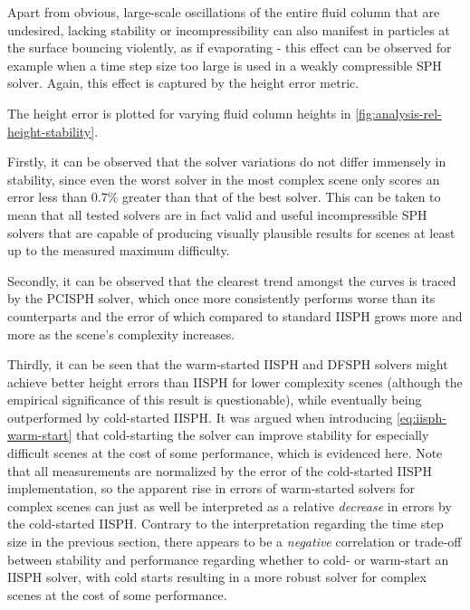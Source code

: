 \documentclass[oneside, a4paper]{book}
\begin{document}
  Apart from obvious, large-scale oscillations of the entire fluid column that are undesired, lacking stability or incompressibility can also manifest in particles at the surface bouncing violently, as if evaporating - this effect can be observed for example when a time step size too large is used in a weakly compressible SPH solver. Again, this effect is captured by the height error metric.

  The height error is plotted for varying fluid column heights in \autoref{fig:analysis-rel-height-stability}. 

  Firstly, it can be observed that the solver variations do not differ immensely in stability, since even the worst solver in the most complex scene only scores an error less than $0.7\%$ greater than that of the best solver. This can be taken to mean that all tested solvers are in fact valid and useful incompressible SPH solvers that are capable of producing visually plausible results for scenes at least up to the measured maximum difficulty. 
  
  Secondly, it can be observed that the clearest trend amongst the curves is traced by the PCISPH solver, which once more consistently performs worse than its counterparts and the error of which compared to standard IISPH grows more and more as the scene's complexity increases. 

  Thirdly, it can be seen that the warm-started IISPH and DFSPH solvers might achieve better height errors than IISPH for lower complexity scenes (although the empirical significance of this result is questionable), while eventually being outperformed by cold-started IISPH. It was argued when introducing \autoref{eq:iisph-warm-start} that cold-starting the solver can improve stability for especially difficult scenes at the cost of some performance, which is evidenced here. Note that all measurements are normalized by the error of the cold-started IISPH implementation, so the apparent rise in errors of warm-started solvers for complex scenes can just as well be interpreted as a relative \textit{decrease} in errors by the cold-started IISPH. Contrary to the interpretation regarding the time step size in the previous section, there appears to be a \textit{negative} correlation or trade-off between stability and performance regarding whether to cold- or warm-start an IISPH solver, with cold starts resulting in a more robust solver for complex scenes at the cost of some performance. 

  
\end{document}

